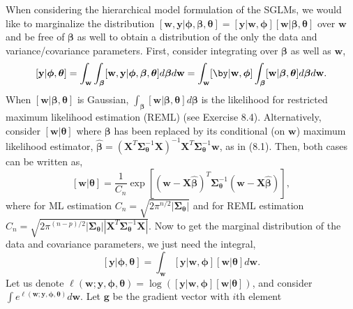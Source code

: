 \documentclass[12pt, titlepage]{article}
\begin{document}
When considering the hierarchical model formulation of the SGLMs, we would like to marginalize the distribution $[\mathbf{w}, \mathbf{y}|\boldsymbol{\phi},\boldsymbol{\beta},\boldsymbol{\theta}] = [\mathbf{y}|\mathbf{w},\boldsymbol{\phi}][\mathbf{w}|\boldsymbol{\beta},\boldsymbol{\theta}]$ over $\mathbf{w}$ and be free of $\boldsymbol{\beta}$ as well to obtain a distribution of the only the data and variance/covariance parameters. First, consider integrating over $\boldsymbol{\beta}$ as well as $\mathbf{w}$,
$$
	[\mathbf{y}|\boldsymbol{\phi},\boldsymbol{\theta}] = \int_\mathbf{w} \int_{\boldsymbol{\beta}} [\mathbf{w}, \mathbf{y}|\boldsymbol{\phi},\boldsymbol{\beta},\boldsymbol{\theta}] d\boldsymbol{\beta} d\mathbf{w} =
		\int_\mathbf{w}  [\by|\mathbf{w},\boldsymbol{\phi}] \int_{\boldsymbol{\beta}} [\mathbf{w}|\boldsymbol{\beta},\boldsymbol{\theta}] d\boldsymbol{\beta} d\mathbf{w}.
$$
When $[\mathbf{w}|\boldsymbol{\beta},\boldsymbol{\theta}]$ is Gaussian, $\int_{\boldsymbol{\beta}} [\mathbf{w}|\boldsymbol{\beta},\boldsymbol{\theta}] d\boldsymbol{\beta}$ is the likelihood for restricted maximum likelihood estimation (REML) (see Exercise 8.4).  Alternatively, consider $[\mathbf{w}|\boldsymbol{\theta}]$ where $\boldsymbol{\beta}$ has been replaced by its conditional (on $\mathbf{w}$) maximum likelihood estimator, $\hat{\boldsymbol{\beta}} = (\mathbf{X}^{T}\boldsymbol{\Sigma}_{\boldsymbol{\theta}}^{-1}\mathbf{X})^{-1}\mathbf{X}^{T}\boldsymbol{\Sigma}_{\boldsymbol{\theta}}^{-1}\mathbf{w}$, as in (8.1).  Then, both cases can be written as,
$$
[\mathbf{w}|\boldsymbol{\theta}] = 
\frac{1}{C_n}\exp[(\mathbf{w} - \mathbf{X}\hat{\boldsymbol{\beta}})^{T}\boldsymbol{\Sigma}_{\boldsymbol{\theta}}^{-1}(\mathbf{w} - \mathbf{X}\hat{\boldsymbol{\beta}})],
$$
where for ML estimation $C_n = \sqrt{2\pi^{n/2}|\boldsymbol{\Sigma}_{\boldsymbol{\theta}}|}$ and for REML estimation $C_n = \sqrt{2\pi^{(n - p)/2}|\boldsymbol{\Sigma}_{\boldsymbol{\theta}}||\mathbf{X}^{T}\boldsymbol{\Sigma}_{\boldsymbol{\theta}}^{-1}\mathbf{X}|}$.  Now to get the marginal distribution of the data and covariance parameters, we just need the integral,
$$
	[\mathbf{y}| \boldsymbol{\phi},\boldsymbol{\theta}] = \int_\mathbf{w}  [\mathbf{y}|\mathbf{w},\boldsymbol{\phi}][\mathbf{w}|\boldsymbol{\theta}]d\mathbf{w}.
$$
Let us denote $\ell(\mathbf{w};\mathbf{y},\boldsymbol{\phi},\boldsymbol{\theta}) = \log([\mathbf{y}|\mathbf{w},\boldsymbol{\phi}][\mathbf{w}|\boldsymbol{\theta}])$, and consider $\int e^{\ell(\mathbf{w};\mathbf{y},\boldsymbol{\phi},\boldsymbol{\theta})} d\mathbf{w}$. Let $\mathbf{g}$ be the gradient vector with $i$th element
\end{document}
